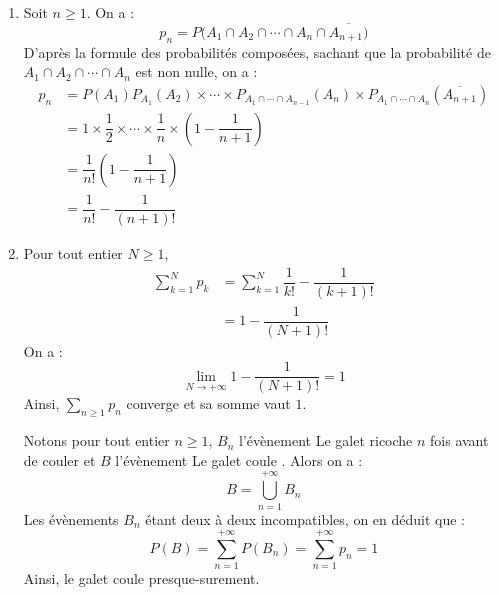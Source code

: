 \documentclass[a4paper,twoside,french,10pt]{VcCours}
\begin{document}
\begin{enumerate}
\item Soit $n \geq 1$. On a :
$$ p_n = P(A_1 \cap A_2 \cap \cdots \cap A_n \cap \overline{A_{n+1})}$$
D'après la formule des probabilités composées, sachant que la probabilité de $A_1 \cap A_2 \cap \cdots \cap A_n $ est non nulle, on a :
\begin{align*}
p_n & = P(A_1) P_{A_1}(A_2) \times \cdots \times P_{A_1 \cap \cdots \cap A_{n-1}}(A_n) \times P_{A_1 \cap \cdots \cap A_{n}}(\overline{A_{n+1}}) \\
& = 1 \times \dfrac{1}{2} \times \cdots \times \dfrac{1}{n} \times \left(1- \dfrac{1}{n+1} \right) \\
& = \dfrac{1}{n!} \left(1- \dfrac{1}{n+1} \right) \\
& = \dfrac{1}{n!} - \dfrac{1}{(n+1)!}
\end{align*}
\item Pour tout entier $N \geq 1$,
\begin{align*}
\sum_{k=1}^N p_k & = \sum_{k=1}^N \dfrac{1}{k!} - \dfrac{1}{(k+1)!} \\
& = 1- \dfrac{1}{(N+1)!}
\end{align*}
On a :
$$ \lim_{N \rightarrow + \infty}  1- \dfrac{1}{(N+1)!} = 1$$
Ainsi, $\sum_{n \geq 1} p_n$ converge et sa somme vaut $1$.



\noindent Notons pour tout entier $n \geq 1$, $B_n$ l'évènement \og Le galet ricoche $n$ fois avant de couler \fg et $B$ l'évènement \og Le galet coule \fg{}. Alors on a :
$$ B = \bigcup_{n=1}^{+ \infty} B_n$$
Les évènements $B_n$ étant deux à deux incompatibles, on en déduit que :
$$ P(B) = \sum_{n=1}^{+ \infty} P(B_n) =  \sum_{n=1}^{+ \infty} p_n = 1$$
Ainsi, le galet coule presque-surement.
\end{enumerate}
\end{document}
